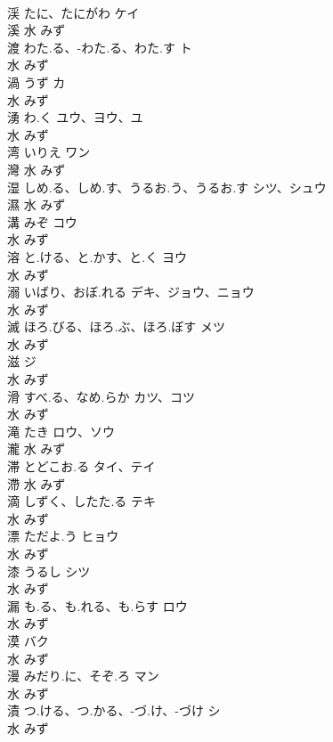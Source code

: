 \documentclass[8pt]{extreport}
\begin{document}
\begin{CJK}{UTF8}{min}
\\	渓	たに、たにがわ	ケイ	
\\	溪	水		みず		
\\	渡	わた.る、-わた.る、わた.す	ト	
\\	水		みず		
\\	渦	うず	カ	
\\	水		みず		
\\	湧	わ.く	ユウ、ヨウ、ユ	
\\	水		みず		
\\	湾	いりえ	ワン	
\\	灣	水		みず		
\\	湿	しめ.る、しめ.す、うるお.う、うるお.す	シツ、シュウ	
\\	濕	水		みず		
\\	溝	みぞ	コウ	
\\	水		みず		
\\	溶	と.ける、と.かす、と.く	ヨウ	
\\	水		みず		
\\	溺	いばり、おぼ.れる	デキ、ジョウ、ニョウ	
\\	水		みず		
\\	滅	ほろ.びる、ほろ.ぶ、ほろ.ぼす	メツ	
\\	水		みず		
\\	滋		ジ	
\\	水		みず		
\\	滑	すべ.る、なめ.らか	カツ、コツ	
\\	水		みず		
\\	滝	たき	ロウ、ソウ	
\\	瀧	水		みず		
\\	滞	とどこお.る	タイ、テイ	
\\	滯	水		みず		
\\	滴	しずく、したた.る	テキ	
\\	水		みず		
\\	漂	ただよ.う	ヒョウ	
\\	水		みず		
\\	漆	うるし	シツ	
\\	水		みず		
\\	漏	も.る、も.れる、も.らす	ロウ	
\\	水		みず		
\\	漠		バク	
\\	水		みず		
\\	漫	みだり.に、そぞ.ろ	マン	
\\	水		みず		
\\	漬	つ.ける、つ.かる、-づ.け、-づけ	シ	
\\	水		みず		

\end{CJK}
\end{document}
